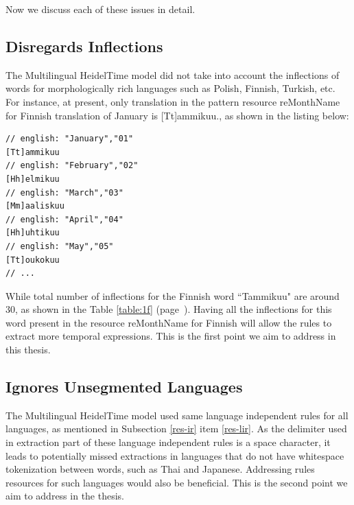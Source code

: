Now we discuss each of these issues in detail.

\subsection{Disregards Inflections}

The Multilingual HeidelTime model did not take into account the inflections of words for morphologically rich languages such as Polish, Finnish, Turkish, etc. For instance, at present, only translation in the pattern resource reMonthName for Finnish translation of January is [Tt]ammikuu., as shown in the listing below:\\


\begin{minipage}{\linewidth}
\begin{lstlisting}
// english: "January","01"
[Tt]ammikuu
// english: "February","02"
[Hh]elmikuu
// english: "March","03"
[Mm]aaliskuu
// english: "April","04"
[Hh]uhtikuu
// english: "May","05"
[Tt]oukokuu
// ...
\end{lstlisting}
\end{minipage}


While total number of inflections for the Finnish word ``Tammikuu" are around 30, as shown in the Table \ref{table:1f} (page~\pageref{table:1f}). Having all the inflections for this word present in the resource reMonthName for Finnish will allow the rules to extract more temporal expressions. This is the first point we aim to address in this thesis.

\subsection{Ignores Unsegmented Languages}
The Multilingual HeidelTime model used same language independent rules for all languages, as mentioned in Subsection \ref{res-ir} item \ref{res-lir}. As the delimiter used in extraction part of these language independent rules is a space character, it leads to potentially missed extractions in languages that do not have whitespace tokenization between words, such as Thai and Japanese. Addressing rules resources for such languages would also be beneficial. This is the second point we aim to address in the thesis.

